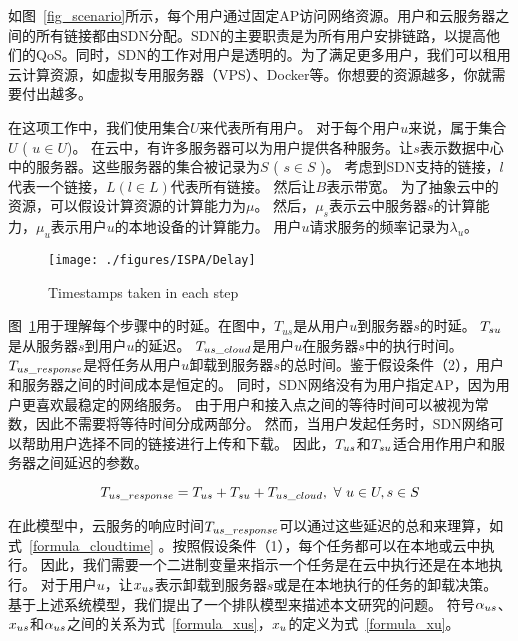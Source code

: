 如图~\ref{fig_scenario}所示，每个用户通过固定AP访问网络资源。用户和云服务器之间的所有链接都由SDN分配。SDN的主要职责是为所有用户安排链路，以提高他们的QoS。同时，SDN的工作对用户是透明的。为了满足更多用户，我们可以租用云计算资源，如虚拟专用服务器（VPS）、Docker等。你想要的资源越多，你就需要付出越多。

在这项工作中，我们使用集合$U$来代表所有用户。 对于每个用户$u$来说，属于集合$U$ ( $ u \in U $)。 在云中，有许多服务器可以为用户提供各种服务。让$s$表示数据中心中的服务器。这些服务器的集合被记录为$S$ ( $ s \in S $ )。 考虑到SDN支持的链接，$l$代表一个链接，$ L ( l \in L ) $代表所有链接。 然后让$B$表示带宽。 为了抽象云中的资源，可以假设计算资源的计算能力为$\mu$。 然后，$\mu_s$表示云中服务器$s$的计算能力，$\mu_u$表示用户$u$的本地设备的计算能力。 用户$u$请求服务的频率记录为$ \lambda_u $。

\begin{figure}[!h]
  \centering
  \vspace{-1em}
  \texttt{[image: ./figures/ISPA/Delay]}
  \vspace{-1em}
  \caption{Timestamps taken in each step}
  \vspace{-1em}
  \label{fig_timestaps}
\end{figure}

图~\ref{fig_timestaps}用于理解每个步骤中的时延。在图中，${T}_{us}$是从用户$u$到服务器$s$的时延。 ${T}_{su}$是从服务器$s$到用户$u$的延迟。 ${T}_{us\_cloud}$是用户$u$在服务器$s$中的执行时间。 ${T}_{us\_response}$是将任务从用户$u$卸载到服务器$s$的总时间。鉴于假设条件（2），用户和服务器之间的时间成本是恒定的。 同时，SDN网络没有为用户指定AP，因为用户更喜欢最稳定的网络服务。 由于用户和接入点之间的等待时间可以被视为常数，因此不需要将等待时间分成两部分。 然而，当用户发起任务时，SDN网络可以帮助用户选择不同的链接进行上传和下载。 因此，${T}_{us}$和${T}_{su}$适合用作用户和服务器之间延迟的参数。

\vspace{-1.5em}
\begin{equation}
\label{formula_cloudtime}
{T}_{us\_response} = {T}_{us} + {T}_{su} + {T}_{us\_cloud},\ \forall \ u \in U, s \in S
\end{equation}

在此模型中，云服务的响应时间${T}_{us\_response}$可以通过这些延迟的总和来理算，如式~\eqref{formula_cloudtime} 。按照假设条件（1），每个任务都可以在本地或云中执行。 因此，我们需要一个二进制变量来指示一个任务是在云中执行还是在本地执行。 对于用户$u$，让${x}_{us}$表示卸载到服务器$s$或是在本地执行的任务的卸载决策。 基于上述系统模型，我们提出了一个排队模型来描述本文研究的问题。 符号${\alpha}_{us}$、${x}_{us}$和${\alpha}_{us}$之间的关系为式~\eqref{formula_xus}，${x}_{u}$的定义为式~\eqref{formula_xu}。

